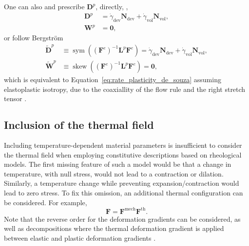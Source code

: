 One can also and prescribe $\mathbf D^p$, directly, \citep{boyceLargeInelasticDeformation1988},
\begin{align}
\label{eq:d_w_directly}
	\mathbf D^p & = \dot\gamma_\text{dev} \mathbf N_\text{dev} + \dot\gamma_\text{vol} \mathbf N_\text{vol},\\
	\mathbf W^p & = \bm 0,
\end{align}
or follow Bergström \citep{bergstromMechanicsSolidPolymers2015}
\begin{align}
	\label{eq:d_w_bergstrom}
	\tilde{\mathbf D}^p &\equiv \operatorname{sym}((\mathbf F^e)^{-1}\mathbf L^p \mathbf F^e) = \dot\gamma_\text{dev} \mathbf N_\text{dev} + \dot\gamma_\text{vol} \mathbf N_\text{vol},\\
	\tilde{\mathbf W}^p &\equiv \operatorname{skew}( (\mathbf F^e)^{-1}\mathbf L^p \mathbf F^e) = \bm 0,
\end{align}
which is equivalent to Equation~\eqref{eq:rate_plasticity_de_souza} assuming elastoplastic isotropy, due to the coaxiallity of the flow rule and the right stretch tensor \citep{desouzanetoComputationalMethodsPlasticity2008}.

\subsection{Inclusion of the thermal field}
\label{sec:inclusion_thermal_field}

Including temperature-dependent material parameters is insufficient to consider the thermal field when employing constitutive descriptions based on rheological models.
The first missing feature of such a model would be that a change in temperature, with null stress, would not lead to a contraction or dilation.
Similarly, a temperature change while preventing expansion/contraction would lead to zero stress.
To fix this omission, an additional thermal configuration can be considered.
For example,
\begin{equation}
	\mathbf F = \mathbf F^\text{mech}\mathbf F^\text{th}.
\end{equation}
Note that the reverse order for the deformation gradients can be considered, as well as decompositions where the thermal deformation gradient is applied between elastic and plastic deformation gradients \citep{arrudaEffectsStrainRate1995}.

